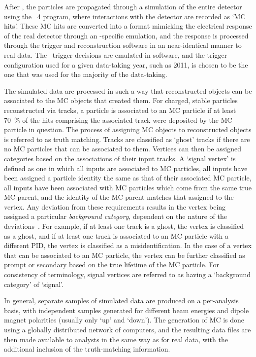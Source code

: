 After \evtgen, the particles are propagated through a simulation of the entire 
detector using the \geant\ 4 program, where interactions with the detector are 
recorded as `\ac{MC} hits'.
These \ac{MC} hits are converted into a format mimicking the electrical 
response of the real detector through an \lhcb-specific emulation, and the 
response is processed through the trigger and reconstruction software in an 
near-identical manner to real data.
The \lzero\ trigger decisions are emulated in software, and the trigger 
configuration used for a given data-taking year, such as 2011, is chosen to be 
the one that was used for the majority of the data-taking.

The simulated data are processed in such a way that reconstructed objects can 
be associated to the \ac{MC} objects that created them.
For charged, stable particles reconstructed via tracks, a particle is 
associated to an \ac{MC} particle if at least \SI{70}{\percent} of the hits 
comprising the associated track were deposited by the \ac{MC} particle in 
question.
The process of assigning \ac{MC} objects to reconstructed objects is referred 
to as truth matching.
Tracks are classified as `ghost' tracks if there are no \ac{MC} particles that 
can be associated to them.
Vertices can then be assigned categories based on the associations of their 
input tracks.
A `signal vertex' is defined as one in which all inputs are associated to 
\ac{MC} particles, all inputs have been assigned a particle identity the same 
as that of their associated \ac{MC} particle, all inputs have been associated 
with \ac{MC} particles which come from the same true \ac{MC} parent, and the 
identity of the \ac{MC} parent matches that assigned to the vertex.
Any deviation from these requirements results in the vertex being assigned a 
particular \emph{background category}, dependent on the nature of the 
deviations~\cite{Gligorov:1035682}.
For example, if at least one track is a ghost, the vertex is classified as a 
ghost, and if at least one track is associated to an \ac{MC} particle with a 
different \ac{PID}, the vertex is classified as a misidentification.
In the case of a vertex that can be associated to an \ac{MC} particle, the 
vertex can be further classified as prompt or secondary based on the true 
lifetime of the \ac{MC} particle.
For consistency of terminology, signal vertices are referred to as having a 
`background category' of `signal'.

In general, separate samples of simulated data are produced on a per-analysis 
basis, with independent samples generated for different beam energies and 
dipole magnet polarities (usually only `up' and `down').
The generation of \ac{MC} is done using a globally distributed network of 
computers, and the resulting data files are then made available to analysts in 
the same way as for real data, with the additional inclusion of the 
truth-matching information.

